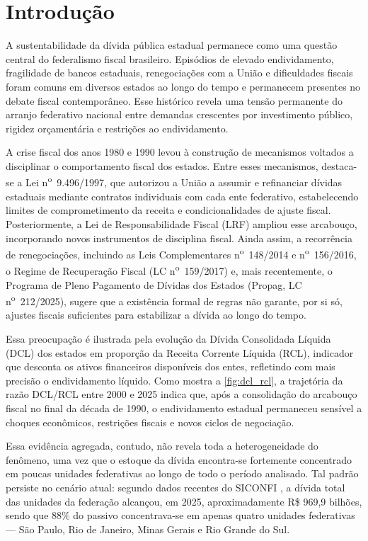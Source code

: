 \chapter{Introdução}
\label{chap:introducao}

A sustentabilidade da dívida pública estadual permanece como uma questão central do federalismo fiscal brasileiro. Episódios de elevado endividamento, fragilidade de bancos estaduais,  renegociações com a União e dificuldades fiscais foram comuns em diversos estados ao longo do tempo e permanecem presentes no debate fiscal contemporâneo. Esse histórico revela uma tensão permanente do arranjo federativo nacional entre demandas crescentes por investimento público, rigidez orçamentária e restrições ao endividamento. 
	
A crise fiscal dos anos 1980 e 1990 levou à construção de mecanismos voltados a disciplinar o comportamento fiscal dos estados. Entre esses mecanismos, destaca-se a Lei n\textsuperscript{o}~9.496/1997, que autorizou a União a assumir e refinanciar dívidas estaduais mediante contratos individuais com cada ente federativo, estabelecendo limites de comprometimento da receita e condicionalidades de ajuste fiscal. Posteriormente, a Lei de Responsabilidade Fiscal (LRF) ampliou esse arcabouço, incorporando novos instrumentos de disciplina fiscal. Ainda assim, a recorrência de renegociações, incluindo as Leis Complementares n\textsuperscript{o}~148/2014 e n\textsuperscript{o}~156/2016, o Regime de Recuperação Fiscal (LC n\textsuperscript{o}~159/2017) e, mais recentemente, o Programa de Pleno Pagamento de Dívidas dos Estados (Propag, LC n\textsuperscript{o}~212/2025), sugere que a existência formal de regras não garante, por si só, ajustes fiscais suficientes para estabilizar a dívida ao longo do tempo.

Essa preocupação é ilustrada pela evolução da Dívida Consolidada Líquida (DCL) dos estados em proporção da Receita Corrente Líquida (RCL), indicador que desconta os ativos financeiros disponíveis dos entes, refletindo com mais precisão o endividamento líquido. Como mostra a \autoref{fig:dcl_rcl}, a trajetória da razão DCL/RCL entre 2000 e 2025 indica que, após a consolidação do arcabouço fiscal no final da década de 1990, o endividamento estadual permaneceu sensível a choques econômicos, restrições fiscais e novos ciclos de negociação.

Essa evidência agregada, contudo, não revela toda a heterogeneidade do fenômeno, uma vez que o estoque da dívida encontra-se fortemente concentrado em poucas unidades federativas ao longo de todo o período analisado. Tal padrão persiste no cenário atual: segundo dados recentes do SICONFI \cite{siconfi2025}, a dívida total das unidades da federação alcançou, em 2025, aproximadamente R\$ 969,9 bilhões, sendo que 88\% do passivo concentrava-se em apenas quatro unidades federativas --- São Paulo, Rio de Janeiro, Minas Gerais e Rio Grande do Sul.

